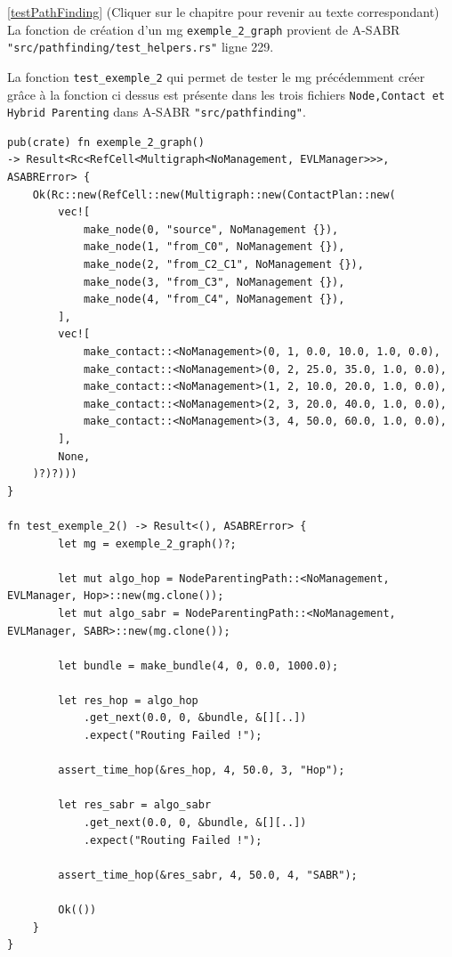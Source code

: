 \documentclass{article}
\begin{document}
\newpage

\label{CodetestPathFinding}
\ref{testPathFinding} (Cliquer sur le chapitre pour revenir au texte correspondant)\\

La fonction de création d'un \gls{mg} \texttt{exemple\_2\_graph} provient de A-SABR \texttt{"src/pathfinding/test\_helpers.rs"} ligne 229.

La fonction \texttt{test\_exemple\_2} qui permet de tester le \gls{mg} précédemment créer grâce à la fonction 
ci dessus est présente dans les trois fichiers \texttt{Node,Contact et Hybrid Parenting} dans A-SABR \texttt{"src/pathfinding"}.

\begin{verbatim}
pub(crate) fn exemple_2_graph()
-> Result<Rc<RefCell<Multigraph<NoManagement, EVLManager>>>, ASABRError> {
    Ok(Rc::new(RefCell::new(Multigraph::new(ContactPlan::new(
        vec![
            make_node(0, "source", NoManagement {}),
            make_node(1, "from_C0", NoManagement {}),
            make_node(2, "from_C2_C1", NoManagement {}),
            make_node(3, "from_C3", NoManagement {}),
            make_node(4, "from_C4", NoManagement {}),
        ],
        vec![
            make_contact::<NoManagement>(0, 1, 0.0, 10.0, 1.0, 0.0),
            make_contact::<NoManagement>(0, 2, 25.0, 35.0, 1.0, 0.0),
            make_contact::<NoManagement>(1, 2, 10.0, 20.0, 1.0, 0.0),
            make_contact::<NoManagement>(2, 3, 20.0, 40.0, 1.0, 0.0),
            make_contact::<NoManagement>(3, 4, 50.0, 60.0, 1.0, 0.0),
        ],
        None,
    )?)?)))
}

fn test_exemple_2() -> Result<(), ASABRError> {
        let mg = exemple_2_graph()?;

        let mut algo_hop = NodeParentingPath::<NoManagement, EVLManager, Hop>::new(mg.clone());
        let mut algo_sabr = NodeParentingPath::<NoManagement, EVLManager, SABR>::new(mg.clone());

        let bundle = make_bundle(4, 0, 0.0, 1000.0);

        let res_hop = algo_hop
            .get_next(0.0, 0, &bundle, &[][..])
            .expect("Routing Failed !");

        assert_time_hop(&res_hop, 4, 50.0, 3, "Hop");

        let res_sabr = algo_sabr
            .get_next(0.0, 0, &bundle, &[][..])
            .expect("Routing Failed !");

        assert_time_hop(&res_sabr, 4, 50.0, 4, "SABR");

        Ok(())
    }
}
\end{verbatim}
\end{document}
